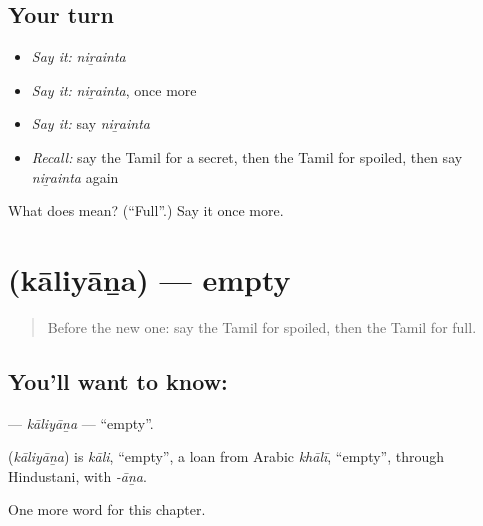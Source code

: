 \subsection*{Your turn}
\begin{itemize}
\raggedright
  \item \emph{Say it:} \emph{niṟainta}
  \item \emph{Say it:} \emph{niṟainta}, once more
  \item \emph{Say it:} say \emph{niṟainta}
  \item \emph{Recall:} say the Tamil for a secret, then the Tamil for spoiled, then say \emph{niṟainta} again
\end{itemize}

\begin{tcolorbox}[breakable,colback=teal!4,colframe=teal!35!black,title={Before you move on}]
What does  mean? (\textquotedblleft{}Full\textquotedblright{}.) Say it once more.
\end{tcolorbox}
\section[\texorpdfstring{\ta{காலியான} (kāliyāṉa)}{காலியான (kāliyāṉa)}]{ (kāliyāṉa) — empty}

\label{lesson:TA-C209-kaliyana}



\begin{quote}
Before the new one: say the Tamil for spoiled, then the Tamil for full.
\end{quote}

\subsection*{You'll want to know: }
\textbf{} — \emph{kāliyāṉa} — \textquotedblleft{}empty\textquotedblright{}.

\begin{cousinweb}
\textbf{} (\emph{kāliyāṉa}) is \emph{kāli}, \textquotedblleft{}empty\textquotedblright{}, a loan from Arabic \emph{khālī}, \textquotedblleft{}empty\textquotedblright{}, through Hindustani, with \emph{-āṉa}.
\end{cousinweb}

\begin{grammarlens}[title={What you've built}]
One more word for this chapter.
\end{grammarlens}


